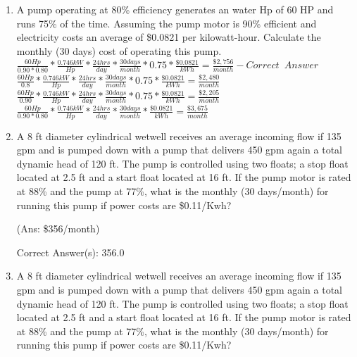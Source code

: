 \documentclass{article}
\begin{document}
\begin{enumerate}
\item A pump operating at 80\% efficiency generates an water Hp of 60 HP and runs 75\% of the time. Assuming the pump motor is 90\% efficient and electricity costs an average of \$0.0821 per kilowatt-hour. Calculate the monthly (30 days) cost of operating this pump.\\
\vspace{0.4cm}
$\frac{60Hp}{0.90*0.80}*\frac{0.746kW}{Hp}*\frac{24hrs}{day}*\frac{30days}{month}*0.75*\frac{\$0.0821}{kWh}=\boxed{\frac{\$2,756}{month}} - Correct \enspace Answer$\\
$\frac{60Hp}{0.8}*\frac{0.746kW}{Hp}*\frac{24hrs}{day}*\frac{30days}{month}*0.75*\frac{\$0.0821}{kWh}=\boxed{\frac{\$2,480}{month}}$\\
$\frac{60Hp}{0.90}*\frac{0.746kW}{Hp}*\frac{24hrs}{day}*\frac{30days}{month}*0.75*\frac{\$0.0821}{kWh}=\boxed{\frac{\$2,205}{month}}$\\
$\frac{60Hp}{0.90*0.80}*\frac{0.746kW}{Hp}*\frac{24hrs}{day}*\frac{30days}{month}*\frac{\$0.0821}{kWh}=\boxed{\frac{\$3,675}{month}}$

\item A 8 ft diameter cylindrical wetwell receives an average incoming flow if 135 gpm and is pumped down with a pump that delivers 450 gpm again a total dynamic head of 120 ft. The pump is controlled using two floats; a stop float located at 2.5 ft and a start float located at 16 ft. If the pump motor is rated at 88\% and the pump at 77\%, what is the monthly (30 days/month) for running this pump if power costs are \$0.11/Kwh?\\
\vspace{0.6cm}



 (Ans: \$356/month) 

Correct Answer(s): 356.0\\
 


\item  A 8 ft diameter cylindrical wetwell receives an average incoming flow if 135 gpm and is pumped down with a pump that delivers 450 gpm again a total dynamic head of 120 ft. The pump is controlled using two floats; a stop float located at 2.5 ft and a start float located at 16 ft. If the pump motor is rated at 88\% and the pump at 77\%, what is the monthly (30 days/month) for running this pump if power costs are \$0.11/Kwh?\\
\vspace{0.6cm}




\end{enumerate}
\end{document}
